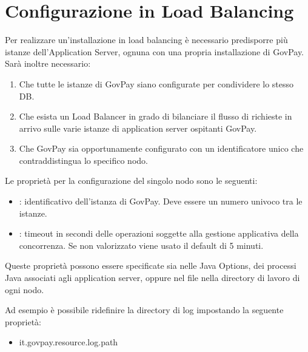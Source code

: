 \documentclass[letterpaper,10pt,italian]{sphinxmanual}
\begin{document}
\chapter{Configurazione in Load Balancing}
\label{\detokenize{loadbalancing/index:configurazione-in-load-balancing}}\label{\detokenize{loadbalancing/index:inst-loadbalancing}}\label{\detokenize{loadbalancing/index::doc}}
Per realizzare un’installazione in load balancing è necessario
predisporre più istanze dell’Application Server, ognuna con una propria
installazione di GovPay. Sarà inoltre necessario:
\begin{enumerate}
\item {} 
Che tutte le istanze di GovPay siano configurate per condividere lo stesso DB.

\item {} 
Che esista un Load Balancer in grado di bilanciare il flusso di richieste in arrivo sulle varie istanze di application server ospitanti GovPay.

\item {} 
Che GovPay sia opportunamente configurato con un identificatore unico che contraddistingua lo specifico nodo.

\end{enumerate}

Le proprietà per la configurazione del singolo nodo sono le seguenti:
\begin{itemize}
\item {} 
: identificativo dell’istanza di GovPay. Deve essere un numero univoco tra le istanze.

\item {} 
: timeout in secondi delle operazioni soggette alla gestione applicativa della concorrenza. Se non valorizzato viene usato il default di 5 minuti.

\end{itemize}

Queste proprietà possono essere specificate sia nelle Java Options, dei processi Java associati agli application server, oppure nel file  nella directory di lavoro di ogni nodo.

Ad esempio è possibile ridefinire la directory di log impostando la seguente proprietà:
\begin{itemize}
\item {} 
it.govpay.resource.log.path

\end{itemize}
\end{document}
